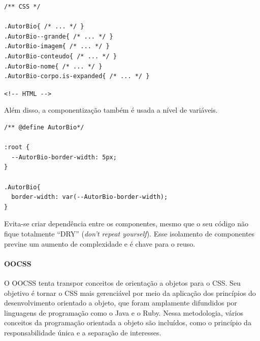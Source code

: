 \begin{verbatim}
/** CSS */

.AutorBio{ /* ... */ }
.AutorBio--grande{ /* ... */ }
.AutorBio-imagem{ /* ... */ }
.AutorBio-conteudo{ /* ... */ }
.AutorBio-nome{ /* ... */ }
.AutorBio-corpo.is-expanded{ /* ... */ }
\end{verbatim}

\noindent
\texttt{<!-{}- HTML -{}->}

\begin{Shaded}
\begin{Highlighting}[]
\KeywordTok{>}  
    \KeywordTok{>}  
    \KeywordTok{>}  
        \KeywordTok{>}  
        \KeywordTok{>} 
\end{Highlighting}
\end{Shaded}

Além disso, a componentização também é usada a nível de variáveis.

\begin{verbatim}
/** @define AutorBio*/

:root {
  --AutorBio-border-width: 5px;
}

.AutorBio{
  border-width: var(--AutorBio-border-width);
}
\end{verbatim}

Evita-se criar dependência entre os componentes, mesmo que o seu código
não fique totalmente ``DRY'' (\emph{don't repeat yourself}). Esse
isolamento de componentes previne um aumento de complexidade e é chave
para o reuso.

\hypertarget{oocss}{%
\paragraph{OOCSS}\label{oocss}}

O OOCSS tenta transpor conceitos de orientação a objetos para o CSS. Seu objetivo é tornar o CSS mais gerenciável
por meio da aplicação dos princípios do desenvolvimento orientado a
objeto, que foram amplamente difundidos por linguagens de programação
como o Java e o Ruby. Nessa metodologia, vários conceitos da programação orientada a objeto
são incluídos, como o princípio da responsabilidade única e a separação
de interesses. \nocite{oocss}

